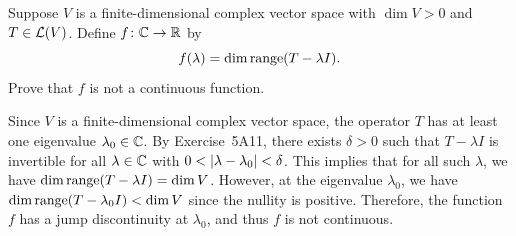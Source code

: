 \begin{exc}
\begin{exercise}
Suppose $V$ is a finite-dimensional complex vector space with $\dim V>0$ and
$T\in\mathcal{L}(V)$. Define $f\colon\mathbb{C}\to\mathbb{R}$ by
\[ f(\lambda)=\operatorname{dim}\operatorname{range}(T-\lambda I). \]
Prove that $f$ is not a continuous function.
\end{exercise}
\begin{solution}
Since $V$ is a finite-dimensional complex vector space, the operator $T$ has
at least one eigenvalue $\lambda_0\in\mathbb{C}$. By Exercise~5A11, there exists
$\delta>0$ such that $T-\lambda I$ is invertible for all $\lambda\in\mathbb{C}$ with
$0<\lvert \lambda-\lambda_0 \rvert<\delta$. This implies that for all such $\lambda$,
we have $\operatorname{dim}\operatorname{range}(T-\lambda I)=\operatorname{dim} V$. However, at the eigenvalue
$\lambda_0$, we have $\operatorname{dim}\operatorname{range}(T-\lambda_0I)<\operatorname{dim} V$ since the nullity is
positive. Therefore, the function $f$ has a jump discontinuity at
$\lambda_0$, and thus $f$ is not continuous.
\end{solution}


\end{exc}
